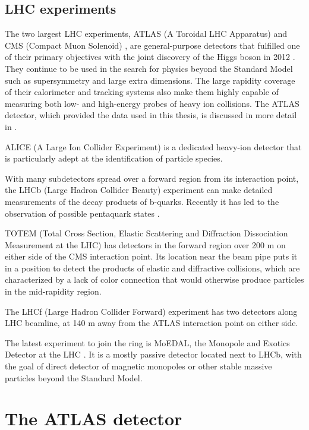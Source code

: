\subsection{LHC experiments}
The two largest LHC experiments, ATLAS (A Toroidal LHC Apparatus) \cite{Aad:2008zzm} and CMS (Compact Muon Solenoid) \cite{Chatrchyan:2008aa}, are general-purpose detectors that fulfilled one of their primary objectives with the joint discovery of the Higgs boson in 2012 \cite{Aad:2012tfa,Chatrchyan:2012xdj}.
They continue to be used in the search for physics beyond the Standard Model such as supersymmetry and large extra dimensions.
The large rapidity coverage of their calorimeter and tracking systems also make them highly capable of measuring both low- and high-energy probes of heavy ion collisions.
The ATLAS detector, which provided the data used in this thesis, is discussed in more detail in \Sect{\ref{sec:atlas}}.

ALICE (A Large Ion Collider Experiment) \cite{Aamodt:2008zz} is a dedicated heavy-ion detector that is particularly adept at the identification of particle species.

With many subdetectors spread over a forward region from its interaction point, the LHCb (Large Hadron Collider Beauty) experiment \cite{Alves:2008zz} can make detailed measurements of the decay products of b-quarks. Recently it has led to the observation of possible pentaquark states \cite{Aaij:2015tga}.

TOTEM (Total Cross Section, Elastic Scattering and Diffraction Dissociation Measurement at the LHC) \cite{Anelli:2008zza} has detectors in the forward region over 200 m on either side of the CMS interaction point.
Its location near the beam pipe puts it in a position to detect the products of elastic and diffractive collisions, which are characterized by a lack of color connection that would otherwise produce particles in the mid-rapidity region.

The LHCf (Large Hadron Collider Forward) experiment \cite{Adriani:2008zz} has two detectors along LHC beamline, at 140 m away from the ATLAS interaction point on either side.

The latest experiment to join the ring is MoEDAL, the Monopole and Exotics Detector at the LHC \cite{Acharya:2014nyr}.
It is a mostly passive detector located next to LHCb, with the goal of direct detector of magnetic monopoles or other stable massive particles beyond the Standard Model.

\section{The ATLAS detector}
\label{sec:atlas}

